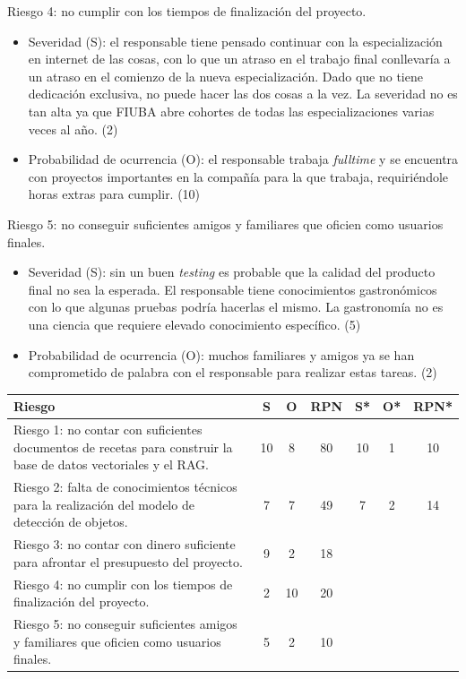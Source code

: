\documentclass[
11pt, %
]{charter}
\begin{document}
Riesgo 4: no cumplir con los tiempos de finalización del proyecto.
\begin{itemize}
\item Severidad (S): el responsable tiene pensado continuar con la especialización en internet de las cosas, con lo que un atraso en el trabajo final conllevaría a un atraso en el comienzo de la nueva especialización. Dado que no tiene dedicación exclusiva, no puede hacer las dos cosas a la vez. La severidad no es tan alta ya que FIUBA abre cohortes de todas las especializaciones varias veces al año. (2)
\item Probabilidad de ocurrencia (O): el responsable trabaja \textit{fulltime} y se encuentra con proyectos importantes en la compañía para la que trabaja, requiriéndole horas extras para cumplir. (10)
\end{itemize}

Riesgo 5: no conseguir suficientes amigos y familiares que oficien como usuarios finales.
\begin{itemize}
\item Severidad (S): sin un buen \textit{testing} es probable que la calidad del producto final no sea la esperada. El responsable tiene conocimientos gastronómicos con lo que algunas pruebas podría hacerlas el mismo. La gastronomía no es una ciencia que requiere elevado conocimiento específico. (5)
\item Probabilidad de ocurrencia (O): muchos familiares y amigos ya se han comprometido de palabra con el responsable para realizar estas tareas. (2)
\end{itemize}



\begin{table}[htpb]
\centering
\begin{tabularx}{\linewidth}{@{}|X|c|c|c|c|c|c|@{}}
\hline
\rowcolor[HTML]{C0C0C0} 
Riesgo & S & O & RPN & S* & O* & RPN* \\ \hline
Riesgo 1: no contar con suficientes documentos de recetas para construir la base de datos vectoriales y el RAG.      & 10   & 8  &  80   & 10   &  1  &   10   \\ \hline
Riesgo 2: falta de conocimientos técnicos para la realización del modelo de detección de objetos.     & 7  & 7  &  49   & 7   &  2  &    14  \\ \hline
Riesgo 3: no contar con dinero suficiente para afrontar el presupuesto del proyecto.       & 9  & 2  &   18  &    &    &      \\ \hline
Riesgo 4: no cumplir con los tiempos de finalización del proyecto.       &  2 & 10  &   20  &    &    &      \\ \hline
Riesgo 5: no conseguir suficientes amigos y familiares que oficien como usuarios finales.       & 5  &  2 &    10 &    &    &      \\ \hline
\end{tabularx}%
\end{table}
\end{document}
